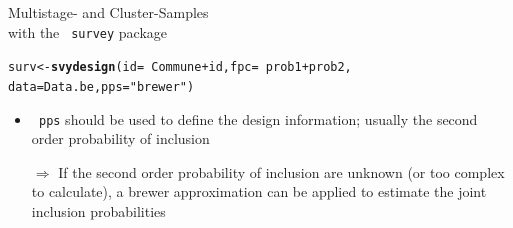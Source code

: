 \documentclass[11pt,german,hideothersubsections]{beamer}\usepackage[]{graphicx}\usepackage[]{color}
\makeatletter
\newcommand{\hlstr}[1]{\textcolor[rgb]{0.192,0.494,0.8}{#1}}%
\newcommand{\hlopt}[1]{\textcolor[rgb]{0,0,0}{#1}}%
\newcommand{\hlstd}[1]{\textcolor[rgb]{0.345,0.345,0.345}{#1}}%
\newcommand{\hlkwb}[1]{\textcolor[rgb]{0.69,0.353,0.396}{#1}}%
\newcommand{\hlkwc}[1]{\textcolor[rgb]{0.333,0.667,0.333}{#1}}%
\newcommand{\hlkwd}[1]{\textcolor[rgb]{0.737,0.353,0.396}{\textbf{#1}}}%
\newenvironment{kframe}{%
 \def\at@end@of@kframe{}%
 \ifinner\ifhmode%
  \def\at@end@of@kframe{\end{minipage}}%
  \begin{minipage}{\columnwidth}%
 \fi\fi%
 \def\FrameCommand##1{\hskip\@totalleftmargin \hskip-\fboxsep
 \colorbox{shadecolor}{##1}\hskip-\fboxsep
     \hskip-\linewidth \hskip-\@totalleftmargin \hskip\columnwidth}%
 \MakeFramed {\advance\hsize-\width
   \@totalleftmargin\z@ \linewidth\hsize
   \@setminipage}}%
 {\par\unskip\endMakeFramed%
 \at@end@of@kframe}
\newenvironment{knitrout}{}{} %
\newcommand{\R}[1]{{\tt \color{blue}  #1}}
\makeatother
\begin{document}
\begin{frame}[fragile]{Multistage- and Cluster-Samples \\ with the \R{survey} package}

\begin{knitrout}
\color{fgcolor}\begin{kframe}
\begin{alltt}
\hlstd{surv} \hlkwb{<-} \hlkwd{svydesign}\hlstd{(}\hlkwc{id}\hlstd{=}\hlopt{~}\hlstd{Commune}\hlopt{+}\hlstd{id,}\hlkwc{fpc}\hlstd{=}\hlopt{~}\hlstd{prob1}\hlopt{+}\hlstd{prob2,}
                  \hlkwc{data}\hlstd{=Data.be,} \hlkwc{pps}\hlstd{=}\hlstr{"brewer"}\hlstd{)}
\end{alltt}
\end{kframe}
\end{knitrout}
\begin{itemize}
\item \R{pps} should be used to define the design information; usually the second order probability of inclusion
\item[$\Rightarrow$] If the second order probability of inclusion are unknown (or too complex to calculate), a brewer approximation can be applied to estimate the joint inclusion probabilities
\end{itemize}

\end{frame}
\end{document}
